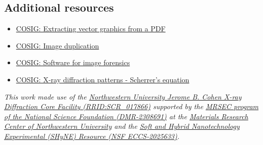 \documentclass[letterpaper, 12pt]{article}
\begin{document}
\subsection*{Additional resources}

\begin{itemize}
    \setlength\itemsep{-0.5em}
    \item \href{https://osf.io/n8fvw}{COSIG: Extracting vector graphics from a PDF}
    \item \href{https://osf.io/547re}{COSIG: Image duplication}
    \item \href{https://osf.io/g23pf}{COSIG: Software for image forensics}
    \item \href{https://osf.io/hf7qy}{COSIG: X-ray diffraction patterns - Scherrer's equation}
\end{itemize}

\textit{This work made use of the \href{http://xray.facilities.northwestern.edu/}{Northwestern University Jerome B. Cohen X-ray Diffraction Core Facility (RRID:SCR\_017866)} supported by the \href{https://www.nsf.gov/awardsearch/showAward?AWD_ID=2308691}{MRSEC program of the National Science Foundation (DMR-2308691)} at the \href{https://materials.northwestern.edu/}{Materials Research Center of Northwestern University} and the \href{https://shyne.northwestern.edu/}{Soft and Hybrid Nanotechnology Experimental (SHyNE) Resource (NSF ECCS-2025633)}.}
\end{document}
